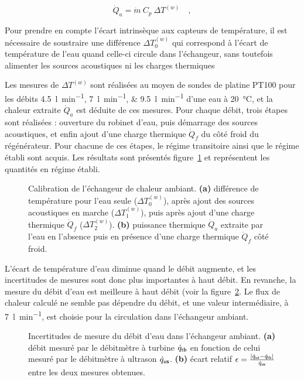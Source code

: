 \begin{equation}
    \dot Q_a = \dot m\ C_p\ \Delta T^{(w)}\quad,
    \label{eq:Qa_puissance}
\end{equation}

Pour prendre en compte l'écart intrinsèque aux capteurs de température, il est nécessaire de soustraire une différence $\Delta T_0^{(w)}$ qui correspond à l'écart de température de l'eau quand celle-ci circule dans l'échangeur, sans toutefois alimenter les sources acoustiques ni les charges thermiques\medskip

Les mesures de $\Delta T^{(w)}$ sont réalisées au moyen de sondes de platine PT100 pour les débits \qtylist{4.5;7;9.5}{\litre\per\minute} d'une eau à \qty{20}{\degreeCelsius}, et la chaleur extraite $\dot Q_a$ est déduite de ces mesures. Pour chaque débit, trois étapes sont réalisées : ouverture du robinet d'eau, puis démarrage des sources acoustiques, et enfin ajout d'une charge thermique $\dot Q_f$ du côté froid du régénérateur. Pour chacune de ces étapes, le régime transitoire ainsi que le régime établi sont acquis. Les résultats sont présentés figure~\ref{fig:AHXCalib} et représentent les quantités en régime établi. 

\begin{figure}[!ht]
    \centering
    
    \caption[Calibration de l'échangeur de chaleur ambiant.]{Calibration de l'échangeur de chaleur ambiant. \textbf{(a)} différence de température pour l'eau seule ($\Delta T_0^{(w)}$), après ajout des sources acoustiques en marche ($\Delta T_1^{(w)}$), puis après ajout d'une charge thermique $\dot Q_f$ ($\Delta T_2^{(w)}$). \textbf{(b)} puissance thermique $\dot Q_a$ extraite par l'eau en l'absence puis en présence d'une charge thermique $\dot Q_f$ côté froid.}
    \label{fig:AHXCalib}
\end{figure}

L'écart de température d'eau diminue quand le débit augmente, et les incertitudes de mesures sont donc plus importantes à haut débit. En revanche, la mesure du débit d'eau est meilleure à haut débit (voir la figure~\ref{fig:IncertitudeDebitEau}. Le flux de chaleur calculé ne semble pas dépendre du débit, et une valeur intermédiaire, à \qty{7}{\litre\per\minute}, est choisie pour la circulation dans l'échangeur ambiant.


\begin{figure}[!ht]
    \centering
    
    \caption[Incertitudes de mesure du débit d'eau dans l'échangeur ambiant]{Incertitudes de mesure du débit d'eau dans l'échangeur ambiant. \textbf{(a)} débit mesuré par le débitmètre à turbine $\dot q_{\sf tb}$ en fonction de celui mesuré par le débitmètre à ultrason $\dot q_{\sf us}$. \textbf{(b)} écart relatif $\epsilon=\frac{|\dot q_{\sf us}-\dot q_{\sf tb}|}{\dot q_{\sf us}}$ entre les deux mesures obtenues.}
    \label{fig:IncertitudeDebitEau}
\end{figure}%
